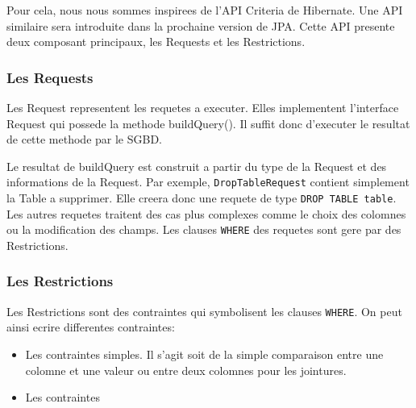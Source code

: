 Pour cela, nous nous sommes inspirees de l'API Criteria de Hibernate. Une API similaire sera introduite dans la prochaine version de JPA. Cette API presente deux composant principaux, les Requests et les Restrictions.
\subsubsection{Les Requests}
Les Request representent les requetes a executer. Elles implementent l'interface Request qui possede la methode buildQuery(). Il suffit donc d'executer le resultat de cette methode par le SGBD. 

Le resultat de buildQuery est construit a partir du type de la Request et des informations de la Request. Par exemple, \texttt{DropTableRequest} contient simplement la Table a supprimer. Elle creera donc une requete de type \texttt{DROP TABLE table}. Les autres requetes traitent des cas plus complexes comme le choix des colomnes ou la modification des champs. 
Les clauses \texttt{WHERE} des requetes sont gere par des Restrictions.
\subsubsection{Les Restrictions}
Les Restrictions sont des contraintes qui symbolisent les clauses \texttt{WHERE}. On peut ainsi ecrire differentes contraintes:
\begin{itemize}
 \item Les contraintes simples. Il s'agit soit de la simple comparaison entre une colomne et une valeur ou entre deux colomnes pour les jointures.
 \item Les contraintes 
\end{itemize}

